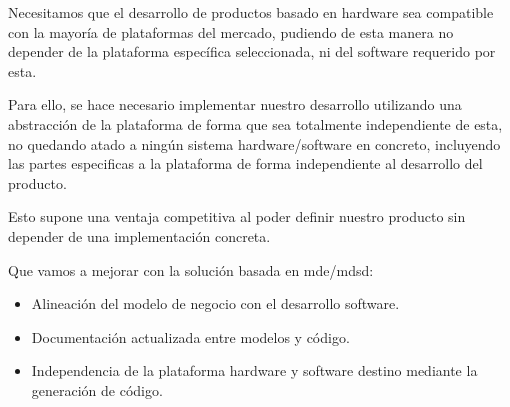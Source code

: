 Necesitamos que el desarrollo de productos basado en hardware sea compatible con la mayoría de plataformas del mercado, pudiendo de esta manera no depender de la plataforma específica seleccionada, ni del software requerido por esta.

Para ello, se hace necesario implementar nuestro desarrollo utilizando una abstracción de la plataforma de forma que sea totalmente independiente de esta, no quedando atado a ningún sistema hardware/software en concreto, incluyendo las partes especificas a la plataforma de forma independiente al desarrollo del producto.

Esto supone una ventaja competitiva al poder definir nuestro producto sin depender de una implementación concreta. 

Que vamos a mejorar con la solución basada en \gls{mde}/\gls{mdsd}:

\begin{itemize}
\item Alineación del modelo de negocio con el desarrollo software.
\item Documentación actualizada entre modelos y código.
\item Independencia de la plataforma hardware y software destino mediante la generación de código.

\end{itemize}


